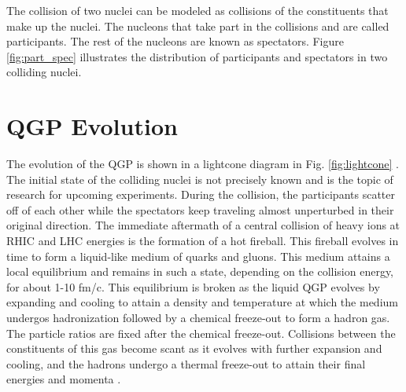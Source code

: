 The collision of two nuclei can be modeled as collisions of the constituents that make up the nuclei. The nucleons that take part in the collisions and are called participants. The rest of the nucleons are known as spectators. Figure \ref{fig:part_spec} illustrates the distribution of participants and spectators in two colliding nuclei.%

\section{QGP Evolution}
The evolution of the QGP is shown in a lightcone diagram in Fig. \ref{fig:lightcone} \cite{Connors:2017ptx}. The initial state of the colliding nuclei is not precisely known and is the topic of research for upcoming experiments. During the collision, the participants scatter off of each other while the spectators keep traveling almost unperturbed in their original direction. The immediate aftermath of a central collision of heavy ions at RHIC and LHC energies is the formation of a hot fireball. This fireball evolves in time to form a liquid-like medium of quarks and gluons. This medium attains a local equilibrium and remains in such a state, depending on the collision energy, for about 1-10 fm/c. This equilibrium is broken as the liquid QGP evolves by expanding and cooling to attain a density and temperature at which the medium undergos hadronization followed by a chemical freeze-out to form a hadron gas. The particle ratios are fixed after the chemical freeze-out. Collisions between the constituents of this gas become scant as it evolves with further expansion and cooling, and the hadrons undergo a thermal freeze-out to attain their final energies and momenta \cite{Connors:2017ptx}.


